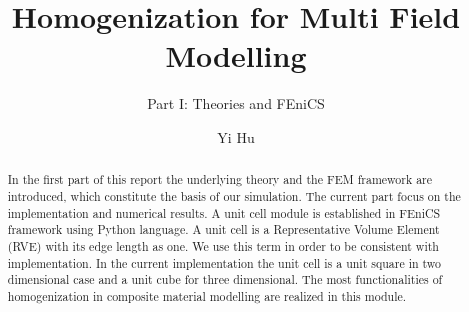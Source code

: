 \documentclass[10pt,a4paper]{scrartcl}
\author{Yi Hu}
\title{Homogenization for Multi Field Modelling}
\subtitle{Part I: Theories and FEniCS}
\begin{document}
\begin{abstract}
In the first part of this report the underlying theory and the FEM framework are introduced, which constitute the basis of our simulation. The current part focus on the implementation and numerical results. A unit cell module is established in FEniCS framework using Python language. A unit cell is a Representative Volume Element (RVE) with its edge length as one. We use this term in order to be consistent with implementation. In the current implementation the unit cell is a unit square in two dimensional case and a unit cube for three dimensional. The most functionalities of homogenization in composite material modelling are realized in this module.

\end{abstract}
\end{document}

